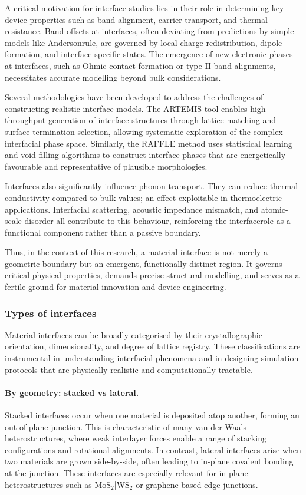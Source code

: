 A critical motivation for interface studies lies in their role in determining key device properties such as band
alignment, carrier transport, and thermal resistance. Band offsets at interfaces, often deviating from predictions
by simple models like Anderson\rqs rule, are governed by local charge redistribution, dipole formation, and
interface-specific states. The emergence of new electronic phases at interfaces, such as Ohmic contact formation or
type-II band alignments, necessitates accurate modelling beyond bulk considerations.

Several methodologies have been developed to address the challenges of constructing realistic interface models. The
ARTEMIS tool enables high-throughput generation of interface structures through lattice matching and surface
termination selection, allowing systematic exploration of the complex interfacial phase space. Similarly, the RAFFLE
method uses statistical learning and void-filling algorithms to construct interface phases that are energetically
favourable and representative of plausible morphologies.

Interfaces also significantly influence phonon transport. They can reduce thermal conductivity compared to bulk
values; an effect exploitable in thermoelectric applications. Interfacial scattering, acoustic impedance mismatch,
and atomic-scale disorder all contribute to this behaviour, reinforcing the interface\rqs role as a functional
component rather than a passive boundary.

Thus, in the context of this research, a material interface is not merely a geometric boundary but an emergent,
functionally distinct region. It governs critical physical properties, demands precise structural modelling, and
serves as a fertile ground for material innovation and device engineering.

\subsubsection{Types of interfaces}

Material interfaces can be broadly categorised by their crystallographic orientation, dimensionality, and degree of
lattice registry. These classifications are instrumental in understanding interfacial phenomena and in designing
simulation protocols that are physically realistic and computationally tractable.

\paragraph{By geometry: stacked vs lateral.}
Stacked interfaces occur when one material is deposited atop another, forming an out-of-plane junction. This is
characteristic of many van der Waals heterostructures, where weak interlayer forces enable a range of stacking
configurations and rotational alignments. In contrast, lateral interfaces arise when two materials are grown
side-by-side, often leading to in-plane covalent bonding at the junction. These interfaces are especially relevant
for in-plane heterostructures such as MoS$_2$|WS$_2$ or graphene-based edge-junctions.

